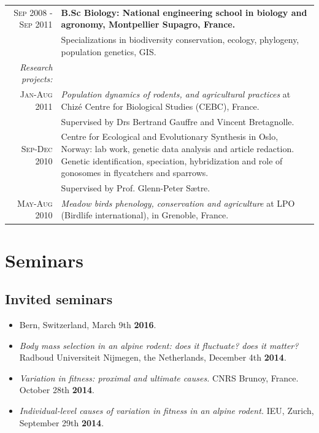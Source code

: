\begin{tabular}{r|p{11cm}}
\textsc{Sep 2008 - Sep 2011} & \textbf{B.Sc Biology: National engineering school in biology and agronomy, Montpellier Supagro, France.}\\
& \footnotesize{Specializations in biodiversity conservation, ecology, phylogeny, population genetics, GIS.}\\
\textit{Research projects:} & \\
\footnotesize{\textsc{Jan-Aug 2011}}& \emph{Population dynamics of rodents, and agricultural practices} at Chiz\'{e} Centre for Biological Studies (CEBC), France.\\ 
																		& \footnotesize{Supervised by Drs Bertrand Gauffre and Vincent Bretagnolle.} \par \\
\footnotesize{\textsc{Sep-Dec 2010}}&	Centre for Ecological and Evolutionary Synthesis in Oslo, Norway: lab work, genetic data analysis and article redaction. Genetic identification, speciation, hybridization and role of gonosomes in flycatchers and sparrows.\\
																		& \footnotesize{Supervised by Prof. Glenn-Peter S{\ae}tre.}\par \\
\footnotesize{\textsc{May-Aug 2010}}& \emph{Meadow birds phenology, conservation and agriculture} at LPO (Birdlife international), in Grenoble, France.
\end{tabular}



\section{Seminars}
\subsection{Invited seminars}
\begin{itemize}
\item \textit{} Bern, Switzerland, March 9th \textbf{2016}.
\item \textit{Body mass selection in an alpine rodent: does it fluctuate? does it matter?} Radboud Universiteit Nijmegen, the Netherlands, December 4th \textbf{2014}.
\item \textit{Variation in fitness: proximal and ultimate causes.} CNRS Brunoy, France. October 28th \textbf{2014}.
\item \textit{Individual-level causes of variation in fitness in an alpine rodent.} IEU, Zurich, September 29th \textbf{2014}.
\end{itemize}
